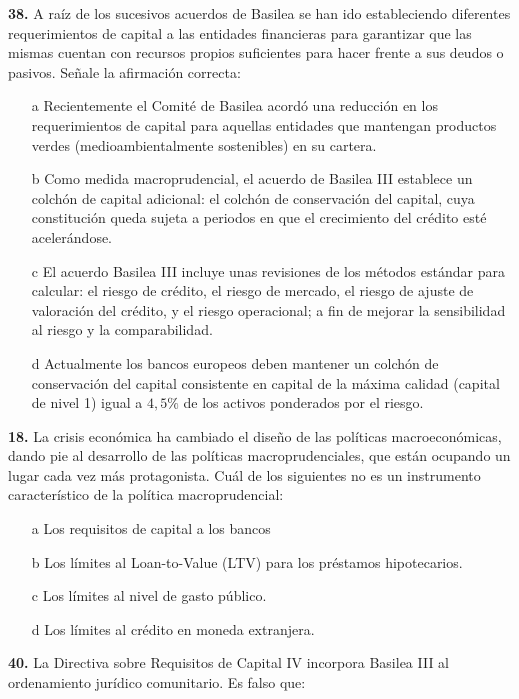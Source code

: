 \documentclass{nuevotema}
\begin{document}
\textbf{38.} A raíz de los sucesivos acuerdos de Basilea se han ido estableciendo diferentes requerimientos de capital a las entidades financieras para garantizar que las mismas cuentan con recursos propios suficientes para hacer frente a sus deudos o pasivos. Señale la afirmación correcta:

\begin{itemize}
	\item[a] Recientemente el Comité de Basilea acordó una reducción en los requerimientos de capital para aquellas entidades que mantengan productos verdes (medioambientalmente sostenibles) en su cartera.
	\item[b] Como medida macroprudencial, el acuerdo de Basilea III establece un colchón de capital adicional: el colchón de conservación del capital, cuya constitución queda sujeta a periodos en que el crecimiento del crédito esté acelerándose.
	\item[c] El acuerdo Basilea III incluye unas revisiones de los métodos estándar para calcular: el riesgo de crédito, el riesgo de mercado, el riesgo de ajuste de valoración del crédito, y el riesgo operacional; a fin de mejorar la sensibilidad al riesgo y la comparabilidad.
	\item[d] Actualmente los bancos europeos deben mantener un colchón de conservación del capital consistente en capital de la máxima calidad (capital de nivel 1) igual a $4,5\%$ de los activos ponderados por el riesgo.
\end{itemize}


\textbf{18.} La crisis económica ha cambiado el diseño de las políticas macroeconómicas, dando pie al desarrollo de las políticas macroprudenciales, que están ocupando un lugar cada vez más protagonista. Cuál de los siguientes no es un instrumento característico de la política macroprudencial:

\begin{itemize}
	\item[a] Los requisitos de capital a los bancos
	\item[b] Los límites al Loan-to-Value (LTV) para los préstamos hipotecarios.
	\item[c] Los límites al nivel de gasto público.
	\item[d] Los límites al crédito en moneda extranjera.
\end{itemize}

\textbf{40.} La Directiva sobre Requisitos de Capital IV incorpora Basilea III al ordenamiento jurídico comunitario. Es falso que:
\end{document}
